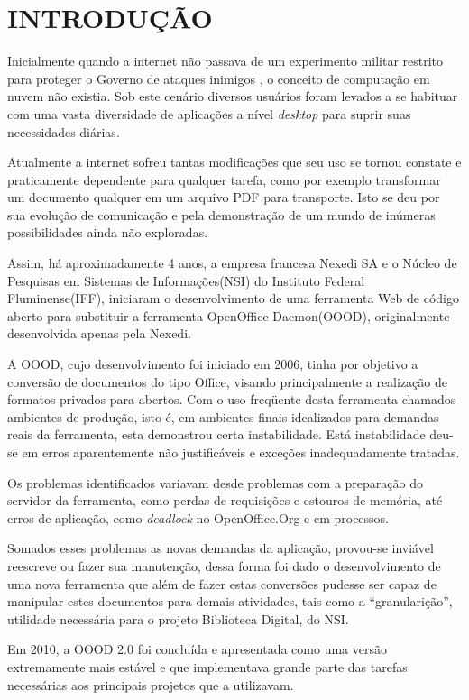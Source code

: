 \chapter{INTRODUÇÃO}
\thispagestyle{empty}

Inicialmente quando a internet não passava de um experimento militar restrito para proteger o Governo de ataques inimigos \cite{TESLA}, o conceito de computação em nuvem não existia. Sob este cenário diversos usuários foram levados a se habituar com uma vasta diversidade de aplicações a nível \textit{desktop} para suprir suas necessidades diárias.

Atualmente a internet sofreu tantas modificações que seu uso se tornou constate e praticamente dependente para qualquer tarefa, como por exemplo transformar um documento qualquer em um arquivo PDF para transporte. Isto se deu por sua evolução de comunicação e pela demonstração de um mundo de inúmeras possibilidades ainda não exploradas.

Assim, há aproximadamente 4 anos, a empresa francesa Nexedi SA e o Núcleo de Pesquisas em Sistemas de Informações(NSI) do Instituto Federal Fluminense(IFF), iniciaram o desenvolvimento de uma ferramenta Web de código aberto para substituir a ferramenta OpenOffice Daemon(OOOD), originalmente desenvolvida apenas pela Nexedi.

A OOOD, cujo desenvolvimento foi iniciado em 2006, tinha por objetivo a conversão de documentos do tipo Office, visando principalmente a realização de formatos privados para abertos. Com o uso freqüente desta ferramenta chamados ambientes de produção, isto é, em ambientes finais idealizados para demandas reais da ferramenta, esta demonstrou certa instabilidade. Está instabilidade deu-se em erros aparentemente não justificáveis e exceções inadequadamente tratadas.

Os problemas identificados variavam desde problemas com a preparação do servidor da ferramenta, como perdas de requisições e estouros de memória, até erros de aplicação, como \textit{deadlock} no OpenOffice.Org e em processos.

Somados esses problemas as novas demandas da aplicação, provou-se inviável reescreve ou fazer sua manutenção, dessa forma foi dado o desenvolvimento de uma nova ferramenta que além de fazer estas conversões pudesse ser capaz de manipular estes documentos para demais atividades, tais como a ``granularição'', utilidade necessária para o projeto Biblioteca Digital, do NSI.

Em 2010, a OOOD 2.0 foi concluída e apresentada como uma versão extremamente mais estável e que implementava grande parte das tarefas necessárias aos principais projetos que a utilizavam. 

